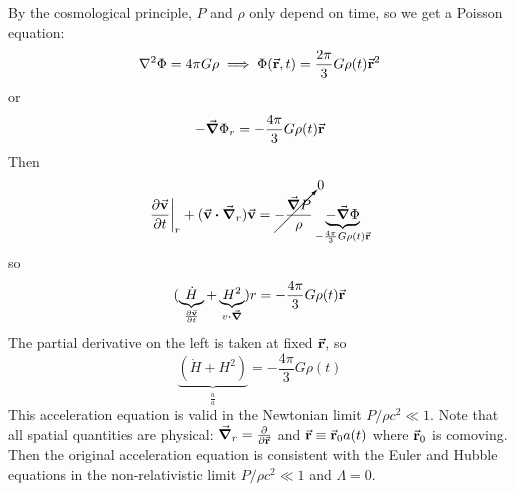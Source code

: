\documentclass[a4paper,twoside,master.tex]{subfiles}
\begin{document}
By the cosmological principle, $ P $ and $ \rho $ only depend on time, so we get a Poisson equation:
\begin{equation}
    \laplacian{\Phi} = 4 \pi G \rho \implies \Phi(\va{r}, t) = \frac{2 \pi}{3} G \rho(t) \va{r}^2
\end{equation}
or
\begin{equation}
    - \grad{\Phi_r} = - \frac{4 \pi}{3} G \rho(t) \va{r}
\end{equation}
Then
\begin{equation}
    \eval{\pdv{\va{v}}{t}}_{r} + (\va{v} \vdot \grad_r) \va{v} = \cancelto{0}{- \frac{\grad{P}}{\rho}} \underbrace{- \grad{\Phi}}_{- \frac{4 \pi}{3} G \rho(t) \va{r}}
\end{equation}
so
\begin{equation}
    (\underbrace{\dot{H}}_{\pdv{\va{v}}{t}} + \underbrace{H^2}_{v \vdot \grad})r = - \frac{4 \pi}{3} G \rho(t) \va{r}
\end{equation}
The partial derivative on the left is taken at fixed $ \va{r} $, so
\begin{equation}
    \underbrace{(\dot{H} + H^2)}_{\frac{\ddot{a}}{a}} = - \frac{4 \pi}{3} G \rho(t)
\end{equation}
This acceleration equation is valid in the Newtonian limit $ P/ \rho c^2 \ll 1 $. Note that all spatial quantities are physical: $ \grad_r = \pdv{\va{r}} $ and $ \va{r} \equiv \va{r}_0 a(t) $ where $ \va{r}_0 $ is comoving. Then the original acceleration equation is consistent with the Euler and Hubble equations in the non-relativistic limit $ P/ \rho c^2 \ll 1 $ and $ \Lambda = 0 $.
\end{document}
